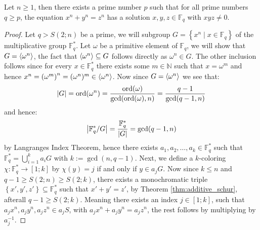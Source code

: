 
\begin{theorem}\label{thm:fermat_last_theorem_over_finite_field}
	Let $n \geq 1$, then there exists a prime number $p$ such that for all prime numbers $q \geq p$, the equation $x^n + y^n = z^{n}$ has a solution $x, y, z \in \mathbb{F}_{q}$ with $xyz \neq 0$.
\end{theorem}
\begin{proof}
	Let $q > S(2; n)$ be a prime, we will subgroup $G = \left\{x^n \mid x \in \mathbb{F}_q\right\}$ of the multiplicative group $\mathbb{F}_q^{*}$. Let $\omega$ be a primitive element of $\mathbb{F}_q$, we will show that $G = \langle\omega^{n}\rangle$, the fact that $\langle\omega^n\rangle \subseteq G$ follows directly as $\omega^n \in G$. The other inclusion follows since for every $x \in \mathbb{F}_q^{*}$ there exists some $m \in \mathbb{N}$ such that $x = \omega^{m}$ and hence $x^n = \left(\omega^m\right)^n = (\omega^{n})^{m} \in \langle\omega^{n}\rangle$. Now since $G = \langle\omega^{n}\rangle$ we see that:
	\begin{equation*}
		\left\lvert G\right\rvert = \textnormal{ord}(\omega^{n}) = \frac{\textnormal{ord}(\omega)}{\gcd(\textnormal{ord}(\omega), n)} = \frac{q - 1}{\gcd(q - 1, n)}
	\end{equation*}
	and hence:
	\begin{equation*}
		\left\lvert\mathbb{F}_q^{*} / G\right\rvert = \frac{\mathbb{F}^{*}_{q}}{\left\lvert G\right\rvert} = \gcd(q - 1, n)
	\end{equation*}
	by Langranges Index Theorem, hence there exists $a_1, a_2, \ldots, a_k \in \mathbb{F}_q^{*}$ such that $\mathbb{F}_q^{*} = \bigcup_{i = 1}^k a_i G$ with $k := \gcd(n, q - 1)$.
	Next, we define a $k$-coloring $\chi: \mathbb{F}_q^* \to [1; k]$ by $\chi(y) = j$ if and only if $y \in a_j G$. Now since $k \leq n$ and $q - 1 \geq S(2; n) \geq S(2; k)$, there exists a monochromatic triple $\left\{x' , y' , z' \right\} \subseteq \mathbb{F}_q^{*}$ such that $x'  + y'  = z' $, by Theorem \ref{thm:additive_schur}, afterall $q - 1 \geq S(2; k)$. Meaning there exists an index $j \in [1; k]$, such that $a_{j}x^{n}, a_jy^{n}, a_{j}z^{n} \in a_jS$, with $a_{j}x^{n} + a_{j}y^{n} = a_jz^{n}$, the rest follows by multiplying by $a_{j}^{-1}$.
\end{proof}

